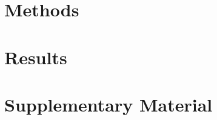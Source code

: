 \documentclass{article}
\newcommand{\detailtexcount}[1]{%
  \immediate\write18{texcount -merge -sum -q #1.tex output.bbl > #1.wcdetail }%
}
\begin{document}

\maketitle
\tableofcontents





\section{Methods}





\section{Results}






%
%
%




\newcommand{\beginsupplement}{
    \setcounter{section}{0}
    \renewcommand{\thesection}{S\arabic{section}}
    \setcounter{figure}{0}
    \renewcommand{\thefigure}{S\arabic{figure}}
    \setcounter{table}{0}
    \renewcommand{\thetable}{S\arabic{table}}
}
\beginsupplement %

\clearpage

\section*{Supplementary Material}




\end{document}
